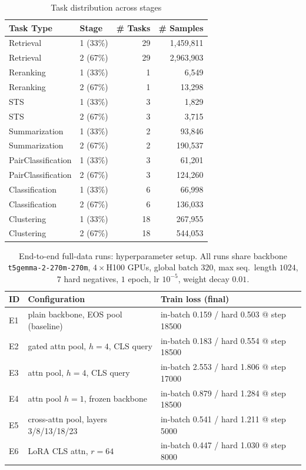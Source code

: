 \documentclass{article}
\begin{document}
\begin{table}[h!]
\centering
\begin{tabular}{llrr}
\hline
\textbf{Task Type} & \textbf{Stage} & \textbf{\# Tasks} & \textbf{\# Samples} \\
\hline
Retrieval & 1 (33\%) & 29 & 1,459,811 \\
Retrieval & 2 (67\%) & 29 & 2,963,903 \\
Reranking & 1 (33\%) & 1 & 6,549 \\
Reranking & 2 (67\%) & 1 & 13,298 \\
STS & 1 (33\%) & 3 & 1,829 \\
STS & 2 (67\%) & 3 & 3,715 \\
Summarization & 1 (33\%) & 2 & 93,846 \\
Summarization & 2 (67\%) & 2 & 190,537 \\
PairClassification & 1 (33\%) & 3 & 61,201 \\
PairClassification & 2 (67\%) & 3 & 124,260 \\
Classification & 1 (33\%) & 6 & 66,998 \\
Classification & 2 (67\%) & 6 & 136,033 \\
Clustering & 1 (33\%) & 18 & 267,955 \\
Clustering & 2 (67\%) & 18 & 544,053 \\
\hline
\end{tabular}
\caption{Task distribution across stages}
\label{tab:task_distribution}
\end{table}

\clearpage 


\begin{table}[ht]
\centering
\small
\setlength{\tabcolsep}{4pt}
\caption{End-to-end full-data runs: hyperparameter setup. All runs share backbone \texttt{t5gemma-2-270m-270m}, $4{\times}$H100 GPUs, global batch $320$, max seq.\ length $1024$, $7$ hard negatives, $1$ epoch, lr $10^{-5}$, weight decay $0.01$.}
\label{tab:e2e-hparams}
\begin{tabular}{lll}
\toprule
ID & Configuration & Train loss (final) \\
\midrule
E1 & plain backbone, EOS pool (baseline) & in-batch 0.159 / hard 0.503 @ step 18500 \\
E2 & gated attn pool, $h{=}4$, CLS query & in-batch 0.183 / hard 0.554 @ step 18500 \\
E3 & attn pool, $h{=}4$, CLS query & in-batch 2.553 / hard 1.806 @ step 17000 \\
E4 & attn pool $h{=}1$, frozen backbone & in-batch 0.879 / hard 1.284 @ step 18500 \\
E5 & cross-attn pool, layers 3/8/13/18/23 & in-batch 0.541 / hard 1.211 @ step 5000 \\
E6 & LoRA CLS attn, $r{=}64$ & in-batch 0.447 / hard 1.030 @ step 8000 \\
\bottomrule
\end{tabular}
\end{table}
\end{document}
